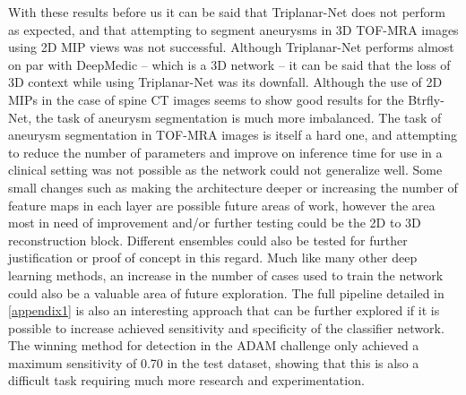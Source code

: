 With these results before us it can be said that Triplanar-Net does not perform as expected, and that attempting to segment aneurysms in 3D TOF-MRA images using 2D MIP views was not successful. Although Triplanar-Net performs almost on par with DeepMedic -- which is a 3D network -- it can be said that the loss of 3D context while using Triplanar-Net was its downfall. Although the use of 2D MIPs in the case of spine CT images seems to show good results for the Btrfly-Net, the task of aneurysm segmentation is much more imbalanced. The task of aneurysm segmentation in TOF-MRA images is itself a hard one, and attempting to reduce the number of parameters and improve on inference time for use in a clinical setting was not possible as the network could not generalize well. Some small changes such as making the architecture deeper or increasing the number of feature maps in each layer are possible future areas of work, however the area most in need of improvement and/or further testing could be the 2D to 3D reconstruction block. Different ensembles could also be tested for further justification or proof of concept in this regard. Much like many other deep learning methods, an increase in the number of cases used to train the network could also be a valuable area of future exploration. The full pipeline detailed in \ref{appendix1} is also an interesting approach that can be further explored if it is possible to increase achieved sensitivity and specificity of the classifier network. The winning method for detection in the ADAM challenge only achieved a maximum sensitivity of 0.70 in the test dataset, showing that this is also a difficult task requiring much more research and experimentation.







